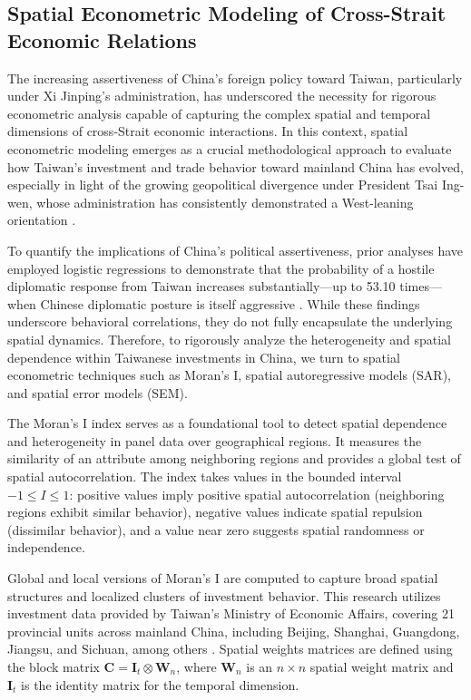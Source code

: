 \documentclass{article}
\begin{document}
\subsection{Spatial Econometric Modeling of Cross-Strait Economic Relations}

The increasing assertiveness of China’s foreign policy toward Taiwan, particularly under Xi Jinping’s administration, has underscored the necessity for rigorous econometric analysis capable of capturing the complex spatial and temporal dimensions of cross-Strait economic interactions. In this context, spatial econometric modeling emerges as a crucial methodological approach to evaluate how Taiwan’s investment and trade behavior toward mainland China has evolved, especially in light of the growing geopolitical divergence under President Tsai Ing-wen, whose administration has consistently demonstrated a West-leaning orientation \citep{tian_china_drops_peaceful_in_push_for_taiwan_reunification}.

To quantify the implications of China’s political assertiveness, prior analyses have employed logistic regressions to demonstrate that the probability of a hostile diplomatic response from Taiwan increases substantially—up to 53.10 times—when Chinese diplomatic posture is itself aggressive \citep{pietrafesa_political_economic_relations_china_taiwan_usa}. While these findings underscore behavioral correlations, they do not fully encapsulate the underlying spatial dynamics. Therefore, to rigorously analyze the heterogeneity and spatial dependence within Taiwanese investments in China, we turn to spatial econometric techniques such as Moran’s I, spatial autoregressive models (SAR), and spatial error models (SEM).

The Moran’s I index serves as a foundational tool to detect spatial dependence and heterogeneity in panel data over geographical regions. It measures the similarity of an attribute among neighboring regions and provides a global test of spatial autocorrelation. The index takes values in the bounded interval $-1 \leq I \leq 1$: positive values imply positive spatial autocorrelation (neighboring regions exhibit similar behavior), negative values indicate spatial repulsion (dissimilar behavior), and a value near zero suggests spatial randomness or independence.

Global and local versions of Moran’s I are computed to capture broad spatial structures and localized clusters of investment behavior. This research utilizes investment data provided by Taiwan's Ministry of Economic Affairs, covering 21 provincial units across mainland China, including Beijing, Shanghai, Guangdong, Jiangsu, and Sichuan, among others \citep{alves_ml_wald_tests}. Spatial weights matrices are defined using the block matrix $\mathbf{C} = \mathbf{I}_t \otimes \mathbf{W}_n$, where $\mathbf{W}_n$ is an $n \times n$ spatial weight matrix and $\mathbf{I}_t$ is the identity matrix for the temporal dimension.
\end{document}
